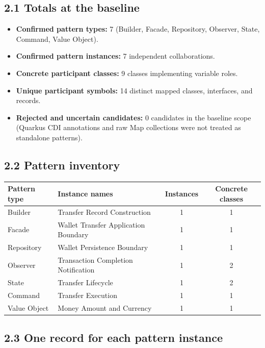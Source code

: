 \documentclass[11pt,a4paper]{article}
\begin{document}
\subsection{2.1 Totals at the baseline}
\begin{itemize}
\item \textbf{Confirmed pattern types:} 7 (Builder, Facade, Repository, Observer, State, Command, Value Object).
\item \textbf{Confirmed pattern instances:} 7 independent collaborations.
\item \textbf{Concrete participant classes:} 9 classes implementing variable roles.
\item \textbf{Unique participant symbols:} 14 distinct mapped classes, interfaces, and records.
\item \textbf{Rejected and uncertain candidates:} 0 candidates in the baseline scope (Quarkus CDI annotations and raw Map collections were not treated as standalone patterns).
\end{itemize}

\subsection{2.2 Pattern inventory}
\begin{tabularx}{\linewidth}{@{}lYcc@{}}
\toprule
\textbf{Pattern type} & \textbf{Instance names} & \textbf{Instances} & \textbf{Concrete classes} \\
\midrule
Builder & Transfer Record Construction & 1 & 1 \\
Facade & Wallet Transfer Application Boundary & 1 & 1 \\
Repository & Wallet Persistence Boundary & 1 & 1 \\
Observer & Transaction Completion Notification & 1 & 2 \\
State & Transfer Lifecycle & 1 & 2 \\
Command & Transfer Execution & 1 & 1 \\
Value Object & Money Amount and Currency & 1 & 1 \\
\bottomrule
\end{tabularx}

\subsection{2.3 One record for each pattern instance}
\end{document}

